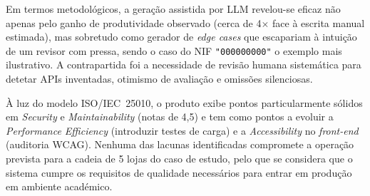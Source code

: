     Em termos metodológicos, a geração assistida por LLM revelou-se eficaz não apenas pelo ganho de produtividade observado (cerca de 4$\times$ face à escrita manual estimada), mas sobretudo como gerador de \textit{edge cases} que escapariam à intuição de um revisor com pressa, sendo o caso do NIF \texttt{"000000000"} o exemplo mais ilustrativo. A contrapartida foi a necessidade de revisão humana sistemática para detetar APIs inventadas, otimismo de avaliação e omissões silenciosas.

    À luz do modelo ISO/IEC~25010, o produto exibe pontos particularmente sólidos em \textit{Security} e \textit{Maintainability} (notas de 4,5) e tem como pontos a evoluir a \textit{Performance Efficiency} (introduzir testes de carga) e a \textit{Accessibility} no \textit{front-end} (auditoria WCAG). Nenhuma das lacunas identificadas compromete a operação prevista para a cadeia de 5 lojas do caso de estudo, pelo que se considera que o sistema cumpre os requisitos de qualidade necessários para entrar em produção em ambiente académico.
